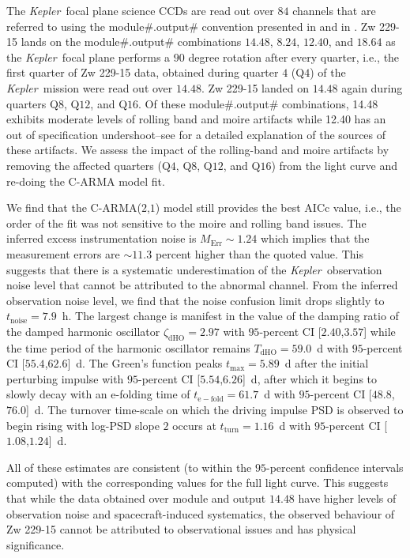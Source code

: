 \documentclass[a4paper,fleqn,usenatbib]{mnras}
\newcommand{\Kepler}{\textit{Kepler~}}
\begin{document}
The \Kepler focal plane science CCDs are read out over $84$ channels that are referred to using the module\#.output\# convention presented in \citet{KIH} and in \citet{Kasliwal15}. Zw 229-15 lands on the module\#.output\# combinations $14$.$48$, $8$.$24$, $12$.$40$, and $18$.$64$ as the \Kepler focal plane performs a $90$ degree rotation after every quarter, i.e., the first quarter of Zw 229-15 data, obtained during quarter $4$ (Q$4$) of the \Kepler mission were read out over $14$.$48$. Zw 229-15 landed on $14$.$48$ again during quarters Q$8$, Q$12$, and Q$16$. Of these module\#.output\# combinations, 14.48 exhibits moderate levels of rolling band and moire artifacts while 12.40 has an out of specification undershoot--see \citet{KIH} for a detailed explanation of the sources of these artifacts. We assess the impact of the rolling-band and moire artifacts by removing the affected quarters (Q$4$, Q$8$, Q$12$, and Q$16$) from the light curve and re-doing the C-ARMA model fit.

We find that the C-ARMA($2$,$1$) model still provides the best AICc value, i.e., the order of the fit was not sensitive to the moire and rolling band issues. The inferred excess instrumentation noise is $M_{\mathrm{Err}} \sim 1.24$ which implies that the measurement errors are $\sim 11.3$ percent higher than the quoted value. This suggests that there is a systematic underestimation of the \Kepler observation noise level that cannot be attributed to the abnormal channel. From the inferred observation noise level, we find that the noise confusion limit drops slightly to $t_{\mathrm{noise}} = 7.9$~h. The largest change is manifest in the value of the damping ratio of the damped harmonic oscillator $\zeta_{\mathrm{dHO}} = 2.97$ with $95$-percent CI [$2.40$,$3.57$] while the time period of the harmonic oscillator remains $T_{\mathrm{dHO}} = 59.0$~d with $95$-percent CI [$55.4$,$62.6$]~d. The Green's function peaks $t_{\mathrm{max}} = 5.89$~d after the initial perturbing impulse with $95$-percent CI [$5.54$,$6.26$]~d, after which it begins to slowly decay with an e-folding time of $t_{\mathrm{e-fold}} = 61.7$~d with $95$-percent CI [$48.8$,$76.0$]~d. The turnover time-scale on which the driving impulse PSD is observed to begin rising with log-PSD slope $2$ occurs at $t_{\mathrm{turn}} = 1.16$~d with $95$-percent CI [$1.08$,$1.24$]~d.

All of these estimates are consistent (to within the $95$-percent confidence intervals computed) with the corresponding values for the full light curve. This suggests that while the data obtained over module and output $14$.$48$ have higher levels of observation noise and spacecraft-induced systematics, the observed behaviour of Zw 229-15 cannot be attributed to observational issues and has physical significance.
\end{document}
